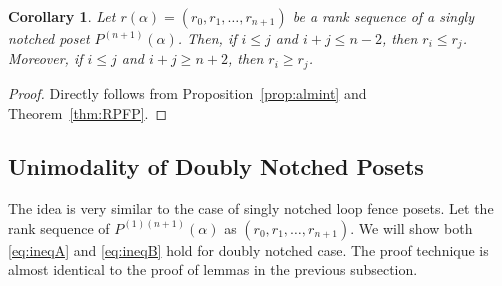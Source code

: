 \documentclass{article}
\newtheorem{cor}{Corollary}
\theoremstyle{remark}
\begin{document}
\begin{cor}\label{cor:eqauni}
    Let $r(\alpha)=(r_0,r_1,\ldots,r_{n+1})$ be a rank sequence of a singly notched poset $P^{(n+1)}(\alpha)$. Then, if $i\le j$ and $i+j\le n-2$, then $r_i\le r_j$. Moreover, if $i\le j$ and $i+j\ge n+2$, then $r_i\ge r_j$.
\end{cor}
\begin{proof}
    Directly follows from Proposition~\ref{prop:almint} and Theorem~\ref{thm:RPFP}.
\end{proof}

\subsection{Unimodality of Doubly Notched Posets}

The idea is very similar to the case of singly notched loop fence posets. Let the rank sequence of $P^{(1)(n+1)}(\alpha)$ as $(r_0,r_1,\ldots,r_{n+1})$. We will show both \eqref{eq:ineqA} and \eqref{eq:ineqB} hold for doubly notched case. The proof technique is almost identical to the proof of lemmas in the previous subsection.
\end{document}
